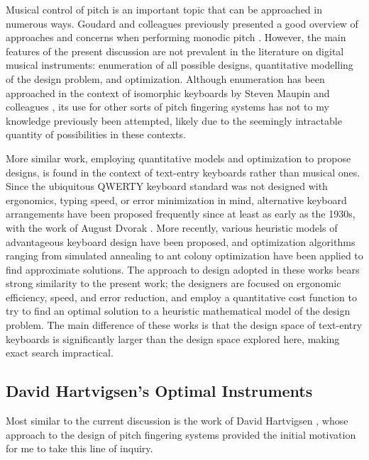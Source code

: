 \documentclass[sigconf]{nimeart}
\begin{document}
Musical control of pitch is an important topic that can be approached in numerous ways. Goudard and colleagues previously presented a good overview of approaches and concerns when performing monodic pitch \cite{Goudard2014}. However, the main features of the present discussion are not prevalent in the literature on digital musical instruments: enumeration of all possible designs, quantitative modelling of the design problem, and optimization. Although enumeration has been approached in the context of isomorphic keyboards by Steven Maupin and colleagues \cite{Maupin2011d}, its use for other sorts of pitch fingering systems has not to my knowledge previously been attempted, likely due to the seemingly intractable quantity of possibilities in these contexts.

More similar work, employing quantitative models and optimization to propose designs, is found in the context of text-entry keyboards rather than musical ones. Since the ubiquitous QWERTY keyboard standard was not designed with ergonomics, typing speed, or error minimization in mind, alternative keyboard arrangements have been proposed frequently since at least as early as the 1930s, with the work of August Dvorak \cite{dvorak1936typewriting}. More recently, various heuristic models of advantageous keyboard design have been proposed, and optimization algorithms ranging from simulated annealing \cite{light1993typewriter} to ant colony optimization \cite{oliverwagner:hal-00748740} have been applied to find approximate solutions. The approach to design adopted in these works bears strong similarity to the present work; the designers are focused on ergonomic efficiency, speed, and error reduction, and employ a quantitative cost function to try to find an optimal solution to a heuristic mathematical model of the design problem. The main difference of these works is that the design space of text-entry keyboards is significantly larger than the design space explored here, making exact search impractical.

\subsection{David Hartvigsen's Optimal Instruments}\label{david-hartvigsens-optimal-instruments}

Most similar to the current discussion is the work of David Hartvigsen \cite{Hartvigsen2010,Hartvigsen2014}, whose approach to the design of pitch fingering systems provided the initial motivation for me to take this line of inquiry.
\end{document}
